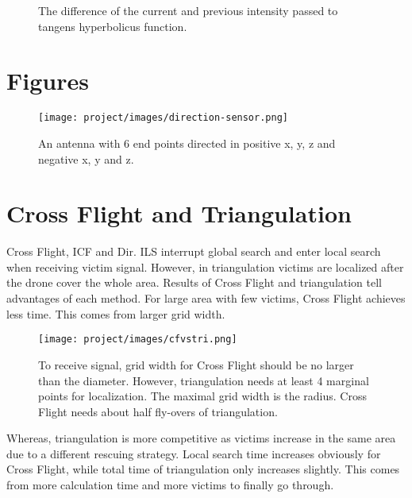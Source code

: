 \documentclass[conference]{IEEEtran}
\begin{document}
\begin{appendices}
\begin{figure}[htbp]
\caption{The difference of the current and previous intensity passed to tangens hyperbolicus function.}
\label{fig:tanh}
\end{figure}

\section{Figures}\label{section:Figures}

\begin{figure}[h!]
    \centering
    \texttt{[image: project/images/direction-sensor.png]}
    \caption{An antenna with 6 end points directed in positive x, y, z and negative x, y and z.}
    \label{fig:direction-sensor}
\end{figure}

\section{Cross Flight and Triangulation} \label{section:Crossandtri}
Cross Flight, ICF and Dir. ILS interrupt global search and enter local search when receiving victim signal. However, in triangulation victims are localized after the drone cover the whole area. Results of Cross Flight and triangulation tell advantages of each method. For large area with few victims, Cross Flight achieves less time. This comes from larger grid width.

\begin{figure}[htbp]
    \centering
    \texttt{[image: project/images/cfvstri.png]}
    \caption{To receive signal, grid width for Cross Flight should be no larger than the diameter. However, triangulation needs at least 4 marginal points for localization. The maximal grid width is the radius. Cross Flight needs about half fly-overs of triangulation.}
    \label{fig:my_label}
\end{figure}

Whereas, triangulation is more competitive as victims increase in the same area due to a different rescuing strategy. Local search time increases obviously for Cross Flight, while total time of triangulation only increases slightly. This comes from more calculation time and more victims to finally go through.


\end{appendices}
\end{document}
